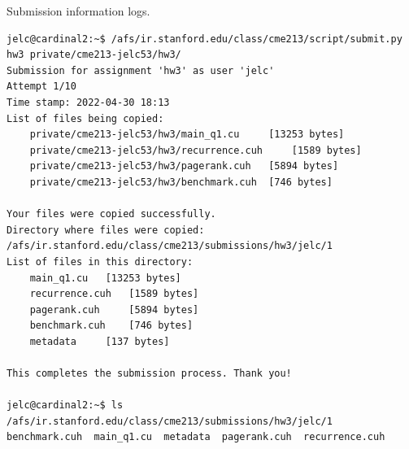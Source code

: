 \documentclass[12pt,letterpaper,twoside]{article}
\begin{document}
Submission information logs.
\begin{verbatim}
jelc@cardinal2:~$ /afs/ir.stanford.edu/class/cme213/script/submit.py hw3 private/cme213-jelc53/hw3/
Submission for assignment 'hw3' as user 'jelc'
Attempt 1/10
Time stamp: 2022-04-30 18:13
List of files being copied:
    private/cme213-jelc53/hw3/main_q1.cu	 [13253 bytes]
    private/cme213-jelc53/hw3/recurrence.cuh	 [1589 bytes]
    private/cme213-jelc53/hw3/pagerank.cuh	 [5894 bytes]
    private/cme213-jelc53/hw3/benchmark.cuh	 [746 bytes]

Your files were copied successfully.
Directory where files were copied: /afs/ir.stanford.edu/class/cme213/submissions/hw3/jelc/1
List of files in this directory:
    main_q1.cu	 [13253 bytes]
    recurrence.cuh	 [1589 bytes]
    pagerank.cuh	 [5894 bytes]
    benchmark.cuh	 [746 bytes]
    metadata	 [137 bytes]

This completes the submission process. Thank you!
    
jelc@cardinal2:~$ ls /afs/ir.stanford.edu/class/cme213/submissions/hw3/jelc/1
benchmark.cuh  main_q1.cu  metadata  pagerank.cuh  recurrence.cuh
\end{verbatim}
\end{document}
